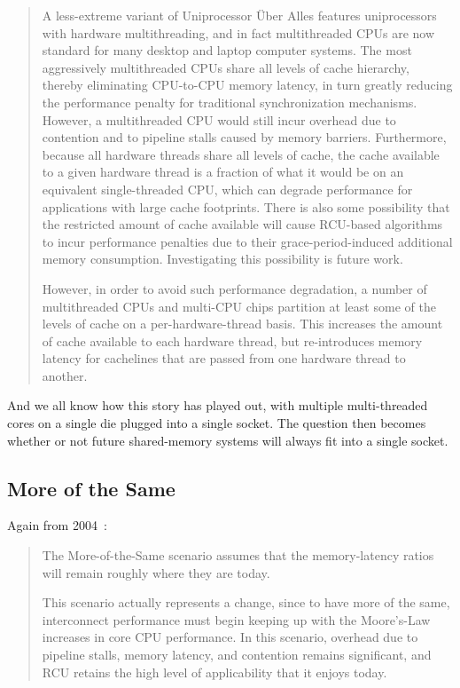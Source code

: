 \begin{quote}
	A less-extreme variant of Uniprocessor \"Uber Alles features
	uniprocessors with hardware multithreading, and in fact
	multithreaded CPUs are now standard for many desktop and laptop
	computer systems.  The most aggressively multithreaded CPUs share
	all levels of cache hierarchy, thereby eliminating CPU-to-CPU
	memory latency, in turn greatly reducing the performance
	penalty for traditional synchronization mechanisms.  However,
	a multithreaded CPU would still incur overhead due to contention
	and to pipeline stalls caused by memory barriers.  Furthermore,
	because all hardware threads share all levels of cache, the
	cache available to a given hardware thread is a fraction of
	what it would be on an equivalent single-threaded CPU, which can
	degrade performance for applications with large cache footprints.
	There is also some possibility that the restricted amount of cache
	available will cause RCU-based algorithms to incur performance
	penalties due to their grace-period-induced additional memory
	consumption.  Investigating this possibility is future work.

	However, in order to avoid such performance degradation, a number
	of multithreaded CPUs and multi-CPU chips partition at least
	some of the levels of cache on a per-hardware-thread basis.
	This increases the amount of cache available to each hardware
	thread, but re-introduces memory latency for cachelines that
	are passed from one hardware thread to another.
\end{quote}

And we all know how this story has played out, with multiple multi-threaded
cores on a single die plugged into a single socket.
The question then becomes whether or not future shared-memory systems will
always fit into a single socket.

\subsection{More of the Same}
\label{sec:meas:More of the Same}

Again from 2004~\cite{PaulEdwardMcKenneyPhD}:

\begin{quote}
	The More-of-the-Same scenario assumes that the memory-latency
	ratios will remain roughly where they are today.

	This scenario actually represents a change, since to have more
	of the same, interconnect performance must begin keeping up
	with the Moore's-Law increases in core CPU performance.  In this
	scenario, overhead due to pipeline stalls, memory latency, and
	contention remains significant, and RCU retains the high level
	of applicability that it enjoys today.
\end{quote}

